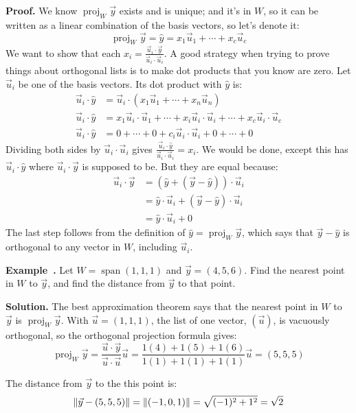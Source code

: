 \documentclass[11pt, letterpaper]{report}
\newenvironment{notes}{}{}
\newenvironment{book}{}{}
\let\originalleft\left
\let\originalright\right
\renewcommand{\left}{\mathopen{}\mathclose\bgroup\originalleft}
\renewcommand{\right}{\aftergroup\egroup\originalright}
\newcounter{example}[section]
\newcommand{\example}{\refstepcounter{example}%
\par\noindent\textbf{Example~\theexample.} }
\newcounter{theorem}[chapter]
\DeclareMathOperator{\spn}{span}
\DeclareMathOperator{\proj}{proj}
\newcommand\nm[1]{\left\lVert #1 \right\rVert}
\begin{document}
\begin{book}
\textbf{Proof.} We know $\proj_W\vec{y}$ exists and is unique; and it's in $W$, so it can be written as a linear combination of the basis vectors, so let's denote it:
\[\proj_W\vec{y}=\hat{y}=x_1\vec{u}_1+\cdots+x_c\vec{u}_c\]
We want to show that each  $x_i= \frac{\vec{u}_i\cdot\vec{y}}{\vec{u}_i\cdot \vec{u}_i}$. A good strategy when trying to prove things about orthogonal lists is to make dot products that you know are zero. Let $\vec{u}_i$ be one of the basis vectors. Its dot product with $\hat{y}$ is:
\begin{align*}
\vec{u}_i\cdot \hat{y} &= \vec{u}_i\cdot ( x_1\vec{u}_1+\cdots+x_n\vec{u}_n ) \\
\vec{u}_i\cdot \hat{y}&=x_1\vec{u}_i\cdot \vec{u}_1 + \cdots + x_i\vec{u}_i\cdot \vec{u}_i + \cdots + x_c\vec{u}_i\cdot \vec{u}_c \\
\vec{u}_i\cdot \hat{y}&= 0 + \cdots + 0 + c_i\vec{u}_i\cdot \vec{u}_i + 0 + \cdots + 0
\end{align*}
Dividing both sides by $\vec{u}_i\cdot \vec{u}_i$ gives $\frac{\vec{u}_i\cdot \hat{y}}{\vec{u}_i\cdot \vec{u}_i} =  x_i$. We would be done, except this has $\vec{u}_i\cdot\hat{y}$ where $\vec{u}_i\cdot\vec{y}$ is supposed to be. But they are equal because:
\begin{align*}
\vec{u}_i\cdot\vec{y} &= ( \hat{y} + ( \vec{y}-\hat{y} ) )\cdot \vec{u}_i \\
&= \hat{y}\cdot \vec{u}_i + ( \vec{y}-\hat{y} )\cdot \vec{u}_i \\
&= \hat{y}\cdot \vec{u}_i + 0
\end{align*}
The last step follows from the definition of $\hat{y}= \proj_W\vec{y}$, which says that $\vec{y}-\hat{y}$ is orthogonal to any vector in $W$, including $\vec{u}_i$. \blacksquare
\end{book}

\example Let $W=\spn(1,1,1)$ and $\vec{y}=(4,5,6)$. Find the nearest point in $W$ to $\vec{y}$, and
find the distance from $\vec{y}$ to that point.

\begin{notes}
\vfill
\end{notes}

\begin{book}
\textbf{Solution.} The best approximation theorem says that the nearest point in $W$ to $\vec{y}$ is $\proj_W\vec{y}$. With $\vec{u}=(1,1,1)$, the list of one vector, $( \vec{u} )$, is vacuously orthogonal, so the orthogonal projection formula gives:
\[\proj_W\vec{y} = \frac{\vec{u}\cdot \vec{y}}{\vec{u}\cdot \vec{u}}\vec{u}=\frac{1(4) + 1(5) + 1(6)}{1(1)+1(1)+1(1)}\vec{u}=(5,5,5)\]

The distance from $\vec{y}$ to the this point is:
\[\nm{\vec{y}-(5,5,5)} = \nm{(-1,0,1)} = \sqrt{(-1)^2+1^2} = \sqrt{2}\]
\end{book}
\end{document}
